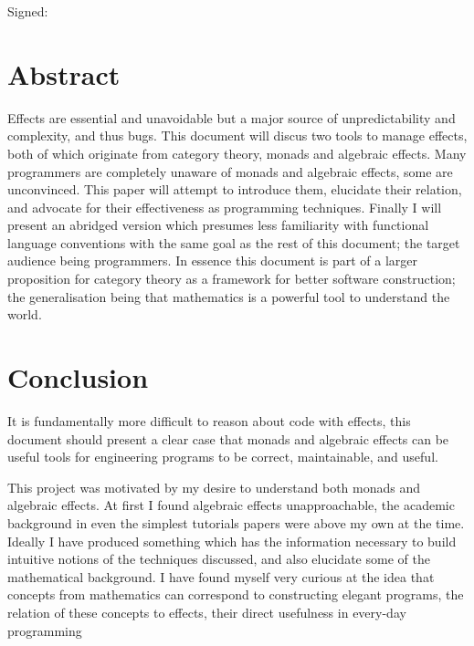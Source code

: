 \documentclass[a4paper,10pt]{article}
\newenvironment{spaced}[1]
  {\begin{minipage}[c]{\textwidth}\vspace{#1}}
  {\end{minipage}}
\theoremstyle{definition}
\begin{document}
  \begin{spaced}{5em}
    Signed:
  \end{spaced}
\pagebreak

\section{Abstract}

Effects are essential and unavoidable
but a major source of unpredictability
and complexity, and thus bugs.
This document will discus two tools to manage effects,
both of which originate from category theory,
monads and algebraic effects.
Many programmers are completely unaware of monads and algebraic effects,
some are unconvinced.
This paper will attempt to introduce them,
elucidate their relation,
and advocate for their effectiveness as programming techniques.
Finally I will present an abridged version
which presumes less familiarity with functional language conventions
with the same goal as the rest of this document;
the target audience being programmers.
In essence this document is part of a larger
proposition for category theory as a framework for better software construction;
the generalisation being that mathematics is a powerful tool to understand the world.

\pagebreak
\tableofcontents

\pagebreak


\pagebreak


\pagebreak


\pagebreak


\pagebreak


\pagebreak
\section{Conclusion}
It is fundamentally more difficult to reason about code with effects,
this document should present a clear case that monads and algebraic effects
can be useful tools for engineering programs to be correct, maintainable, and useful.

This project was motivated by my desire to understand both monads and algebraic effects.
At first I found algebraic effects unapproachable,
the academic background in even the simplest tutorials papers were above my own at the time.
Ideally I have produced something which has the information
necessary to build intuitive notions of the techniques discussed,
and also elucidate some of the mathematical background.
I have found myself very curious at the idea that concepts
from mathematics can correspond to constructing elegant programs,
the relation of these concepts
to effects,
their direct usefulness in
every-day programming
\end{document}
